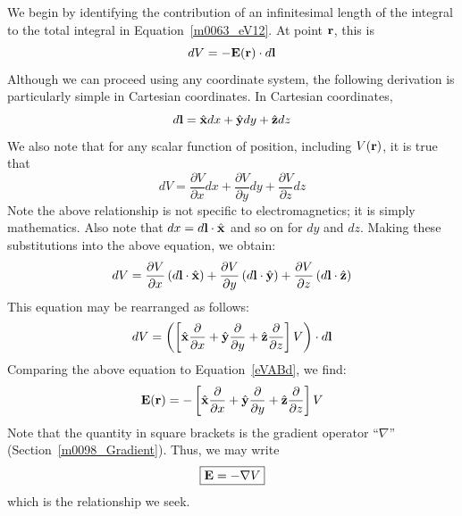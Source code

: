We begin by identifying the contribution of an infinitesimal length of the integral to the total integral in Equation~\ref{m0063_eV12}.  At point ${\bf r}$, this is
%
\begin{equation}
dV = - {\bf E}({\bf r}) \cdot d{\bf l}
\label{eVABd}
\end{equation}
%
Although we can proceed using any coordinate system, the following derivation is particularly simple in Cartesian coordinates.  In Cartesian coordinates,
%
\begin{equation}
d{\bf l} = \hat{\bf x}dx + \hat{\bf y}dy + \hat{\bf z}dz
\end{equation}
%
We also note that for any scalar function of position, including $V({\bf r})$, it is true that
%
\begin{equation}
dV = \frac{\partial V}{\partial x} dx + \frac{\partial V}{\partial y} dy + \frac{\partial V}{\partial z} dz 
\end{equation}
%
Note the above relationship is not specific to electromagnetics; it is simply mathematics.  
Also note that $dx = d{\bf l} \cdot \hat{\bf x}$ and so on for $dy$ and $dz$.  
Making these substitutions into the above equation, we obtain:
%
\begin{equation}
dV = \frac{\partial V}{\partial x} \left( d{\bf l} \cdot \hat{\bf x} \right) 
+ \frac{\partial V}{\partial y} \left( d{\bf l} \cdot \hat{\bf y} \right)
+ \frac{\partial V}{\partial z} \left( d{\bf l} \cdot \hat{\bf z} \right)
\end{equation}
%
This equation may be rearranged as follows:
%
\begin{equation}
dV =  
\left( 
\left[ \hat{\bf x}  \frac{\partial}{\partial x} 
+ \hat{\bf y} \frac{\partial}{\partial y} 
+ \hat{\bf z}\frac{\partial}{\partial z}  \right] V
\right) \cdot d{\bf l}
\end{equation}
%
Comparing the above equation to Equation~\ref{eVABd}, we find:
%
\begin{equation}
{\bf E}({\bf r}) = - \left[ \hat{\bf x}\frac{\partial}{\partial x}   
+ \hat{\bf y} \frac{\partial}{\partial y} 
+ \hat{\bf z}\frac{\partial}{\partial z}  \right] V
\end{equation}
%
Note that the quantity in square brackets is the gradient 
operator ``$\nabla$'' (Section~\ref{m0098_Gradient}).
Thus, we may write
%
\begin{equation}
\boxed{
{\bf E} = - \nabla V
}
\label{m0063_eEPEDV}
\end{equation}
%
which is the relationship we seek.

